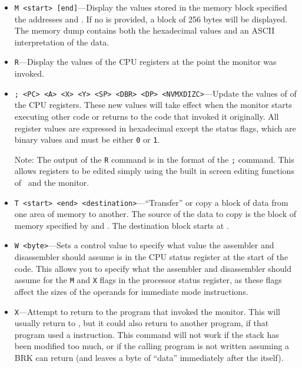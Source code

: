 \documentclass{report}
\begin{document}
\begin{itemize}
        \item \verb+M <start> [end]+---Display the values stored in the memory block specified
            the addresses  and . If no  is provided,
            a block of 256 bytes will be displayed. The memory dump contains both the
            hexadecimal values and an ASCII interpretation of the data.

        \item \verb+R+---Display the values of the CPU registers at the point the monitor
            was invoked.

        \item \verb+; <PC> <A> <X> <Y> <SP> <DBR> <DP> <NVMXDIZC>+---Update the values of
            of the CPU registers. These new values will take effect when the monitor starts
            executing other code or returns to the code that invoked it originally. All register
            values are expressed in hexadecimal except the status flags, which are binary values
            and must be either \verb+0+ or \verb+1+.

            {\sc Note}: The output of the \verb+R+ command is in the format of the \verb+;+
            command. This allows registers to be edited simply using the built in screen
            editing functions of \BASIC\ and the monitor.

        \item \verb+T <start> <end> <destination>+---``Transfer'' or copy a block of data
            from one area of memory to another.
            The source of the data to copy is the block of memory specified by 
            and .
            The destination block starts at .

        \item \verb+W <byte>+---Sets a control value to specify what value the assembler and
            disassembler should assume is in the CPU status register at the start of the code.
            This allows you to specify what the assembler and disassembler should assume for
            the \verb+M+ and \verb+X+ flags in the processor status register, as these flags
            affect the sizes of the operands for immediate mode instructions.

        \item \verb+X+---Attempt to return to the program that invoked the monitor. This will
            usually return to \BASIC, but it could also return to another program, if that
            program used a  instruction. This command will not work if the stack
            has been modified too much, or if the calling program is not written assuming a BRK
            can return (and leaves a byte of ``data'' immediately after the  itself).


\end{itemize}
\end{document}
